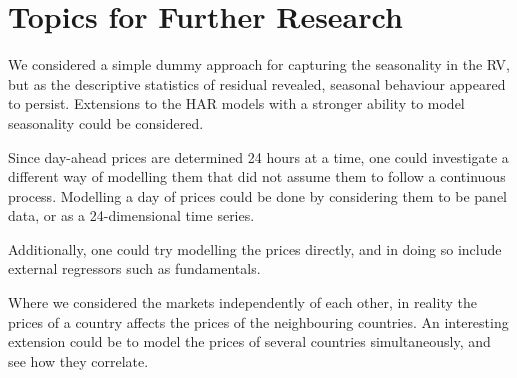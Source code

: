 \newpage
\section{Topics for Further Research}

We considered a simple dummy approach for capturing the seasonality in the RV, but as the descriptive statistics of residual revealed, seasonal behaviour appeared to persist.
Extensions to the HAR models with a stronger ability to model seasonality could be considered.

Since day-ahead prices are determined 24 hours at a time, one could investigate a different way of modelling them that did not assume them to follow a continuous process.
Modelling a day of prices could be done by considering them to be panel data, or as a 24-dimensional time series.

Additionally, one could try modelling the prices directly, and in doing so include external regressors such as fundamentals.

Where we considered the markets independently of each other, in reality the prices of a country affects the prices of the neighbouring countries.
An interesting extension could be to model the prices of several countries simultaneously, and see how they correlate.